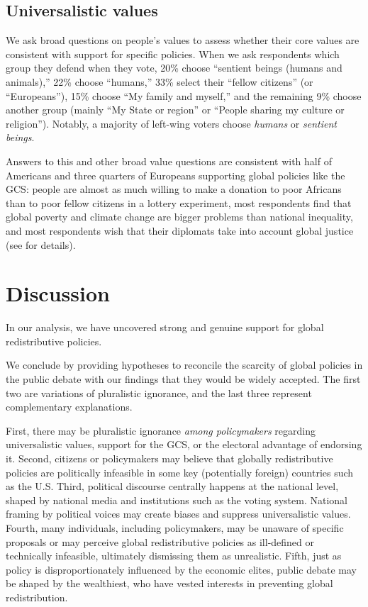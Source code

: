 \documentclass[12pt,english]{article}
\begin{document}
\subsection{Universalistic values}\label{subsec:universalistic}

We ask broad questions on people's values to assess whether their core values are consistent with support for specific policies. 
When we ask respondents which group they defend when they vote, %
20\% choose ``sentient beings (humans and animals),'' 22\% choose ``humans,'' 33\% select their ``fellow citizens'' (or ``Europeans''), 15\% choose ``My family and myself,'' and the remaining 9\% choose another group (mainly ``My State or region'' or ``People sharing my culture or religion''). 
Notably, a majority of left-wing voters choose \textit{humans} or \textit{sentient beings}. 

Answers to this and other broad value questions are consistent with half of Americans and three quarters of Europeans supporting global policies like the GCS: people are almost as much willing to make a donation to poor Africans than to poor fellow citizens in a lottery experiment, most respondents find that global poverty and climate change are bigger problems than national inequality, and most respondents wish that their diplomats take into account global justice (see  for details).
\section{Discussion} %

In our analysis, we have uncovered strong and genuine support for global redistributive policies. %

We conclude by providing hypotheses to reconcile the scarcity of global policies in the public debate with our findings that they would be widely accepted. %
The first two are variations of pluralistic ignorance, and the last three represent complementary explanations. 

First, there may be pluralistic ignorance \textit{among policymakers} regarding universalistic values, support for the GCS, or the electoral advantage of endorsing it. 
Second, citizens or policymakers may believe that globally redistributive policies are politically infeasible in some key (potentially foreign) countries such as the U.S. %
Third, political discourse centrally happens at the national level, shaped by national media and institutions such as the voting system. 
National framing by political voices may create biases and suppress universalistic values. %
Fourth, many individuals, including policymakers, may be unaware of specific proposals or may perceive global redistributive policies as ill-defined or technically infeasible, %
ultimately dismissing them as unrealistic. %
Fifth, just as policy is disproportionately influenced by the economic elites,\citep{mccright_defeating_2003,gilens_testing_2014,persson_rich_2023} public debate may be shaped by the wealthiest, who have vested interests in preventing global redistribution.
\end{document}
